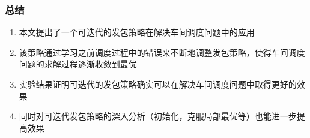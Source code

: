 \begin{frame}
    \frametitle{总结}
    \begin{enumerate}
        \item 本文提出了一个可迭代的发包策略在解决车间调度问题中的应用
        \item 该策略通过学习之前调度过程中的错误来不断地调整发包策略，使得车间调度问题的求解过程逐渐收敛到最优
        \item 实验结果证明可迭代的发包策略确实可以在解决车间调度问题中取得更好的效果
        \item 同时对可迭代发包策略的深入分析（初始化，克服局部最优等）也能进一步提高效果
    \end{enumerate}
\end{frame}